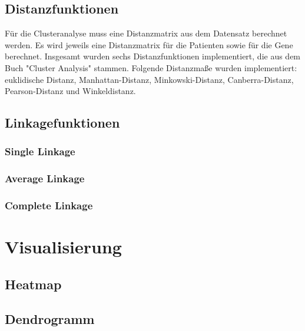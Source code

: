 \documentclass[12pt]{article}
\begin{document}
\subsection{Distanzfunktionen}
\label{distanzfunktionen}
Für die Clusteranalyse muss eine Distanzmatrix aus dem Datensatz berechnet werden. Es wird jeweils eine Distanzmatrix für die Patienten sowie für die Gene berechnet. Insgesamt wurden sechs Distanzfunktionen implementiert, die aus dem Buch "Cluster Analysis" stammen. Folgende Distanzmaße wurden implementiert: euklidische Distanz, Manhattan-Distanz, Minkowski-Distanz, Canberra-Distanz, Pearson-Distanz und Winkeldistanz.  

\subsection{Linkagefunktionen}
\label{linkage-funktionen}

\subsubsection{Single Linkage}
\label{single-linkage}

\subsubsection{Average Linkage}
\label{average-linkage}

\subsubsection{Complete Linkage}
\label{complete-linkage}



\newpage
\pagestyle{fancy}
\fancyhead{}
\section{Visualisierung}
\label{visualisierung}

\subsection{Heatmap}
\label{heatmap}

\subsection{Dendrogramm}
\label{dendrogramm}
\end{document}
